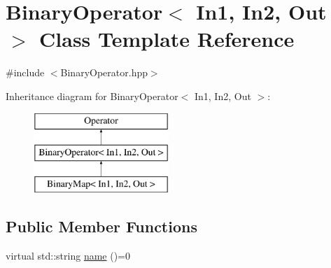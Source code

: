 \hypertarget{class_binary_operator}{\section{\-Binary\-Operator$<$ \-In1, \-In2, \-Out $>$ \-Class \-Template \-Reference}
\label{class_binary_operator}
}


{\ttfamily \#include $<$\-Binary\-Operator.\-hpp$>$}

\-Inheritance diagram for \-Binary\-Operator$<$ \-In1, \-In2, \-Out $>$\-:\begin{figure}[H]
\begin{center}
\leavevmode
\includegraphics[height=3.000000cm]{class_binary_operator}
\end{center}
\end{figure}
\subsection*{\-Public \-Member \-Functions}
\begin{DoxyCompactItemize}
\item 
virtual std\-::string \hyperlink{class_binary_operator_a6df8c4e6dee857f27d870c30d4f65920}{name} ()=0
\end{DoxyCompactItemize}
